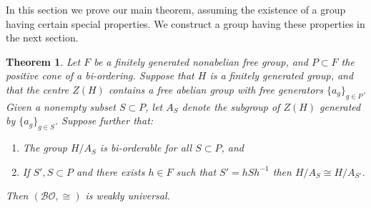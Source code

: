 \documentclass{amsart}
\newtheorem{theorem}{Theorem}[section]
\theoremstyle{definition}
\theoremstyle{remark}
\begin{document}
In this section we prove our main theorem, assuming the existence of a group having certain special properties.  We construct a group having these properties in the next section.

\begin{theorem}
\label{thm:main}
    Let $F$ be a finitely generated nonabelian free group, and $P \subset F$ the positive cone of a bi-ordering.  Suppose that $H$ is a finitely generated group, and that the centre $Z(H)$ contains a free abelian group with free generators $\{a_g\}_{g \in P}$.  Given a nonempty subset $S \subset P$, let $A_S$ denote the subgroup of $Z(H)$ generated by $\{a_g\}_{g \in S}$.  Suppose further that:
    \begin{enumerate}
        \item
        \label{assumption1}
        The group $H/A_S$ is bi-orderable for all $S \subset P$, and
        \item 
        \label{assumption2}
        If $S', S \subset P$ and there exists $h \in F$ such that $S' = hSh^{-1}$ then $H/A_S \cong H/A_{S'}$.
    \end{enumerate}
    Then $(\mathcal{BO}, \cong)$ is weakly universal.
\end{theorem}
\end{document}
